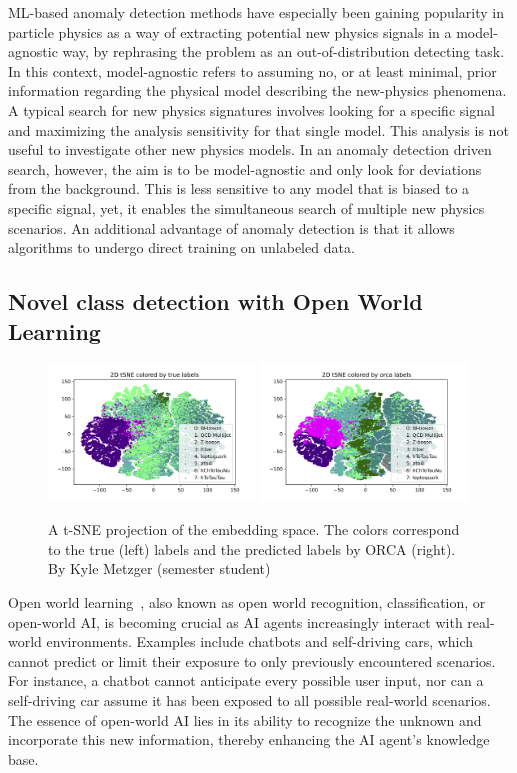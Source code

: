 \documentclass[12pt]{iopart}
\begin{document}
ML-based anomaly detection methods have especially been gaining popularity in particle physics as a way of extracting potential new physics signals in a model-agnostic way, by rephrasing the problem as an out-of-distribution detecting task. In this context, model-agnostic refers to assuming no, or at least minimal, prior information regarding the physical model describing the new-physics phenomena. A typical search for new physics signatures involves looking for a specific signal and maximizing the analysis sensitivity for that single model. This analysis is not useful to investigate other new physics models. In an anomaly detection driven search, however, the aim is to be model-agnostic and only look for deviations from the background. This is less sensitive to any model that is biased to a specific signal, yet, it enables the simultaneous search of multiple new physics scenarios. An additional advantage of anomaly detection is that it allows algorithms to undergo direct training on unlabeled data.

\subsection{Novel class detection with Open World Learning}
\begin{figure}[ht]
    \centering
    \includegraphics[width=0.49\textwidth]{figures/tSNE_2D_true_labels_10.png}
     \includegraphics[width=0.49\textwidth]{figures/tSNE_2D_orca_pred_labels_10.png}
    \caption{A t-SNE projection of the embedding space. The colors correspond to the true (left) labels and the predicted labels by ORCA (right). By Kyle Metzger (semester student) }
    \label{fig:orca}
\end{figure}
Open world learning~\cite{DBLP:journals/corr/abs-2102-03526}, also known as open world recognition, classification, or open-world AI, is becoming crucial as AI agents increasingly interact with real-world environments. Examples include chatbots and self-driving cars, which cannot predict or limit their exposure to only previously encountered scenarios. For instance, a chatbot cannot anticipate every possible user input, nor can a self-driving car assume it has been exposed to all possible real-world scenarios. The essence of open-world AI lies in its ability to recognize the unknown and incorporate this new information, thereby enhancing the AI agent's knowledge base.
\end{document}
